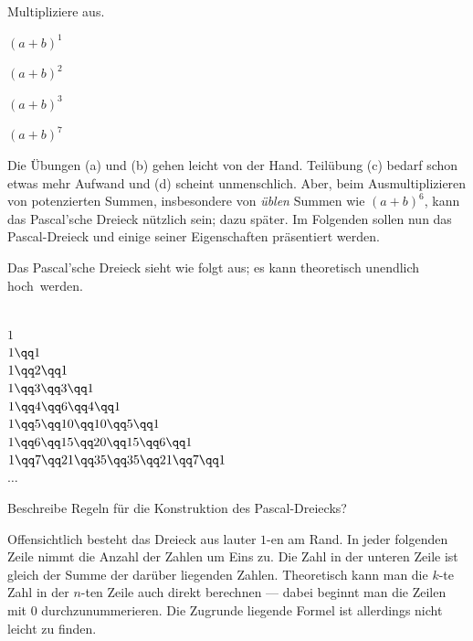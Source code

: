 \documentclass[%
11pt,%
twoside,%
titlepage,%
german,%
]{scrartcl}
\newcounter{theo}[section]\setcounter{theo}{0}
\begin{document}
\begin{ueb}[Binompotenzen]
Multipliziere aus.
  \\[2.5ex]\hspace*{2.7ex}
  \begin{minipage}{0.4\textwidth}
    \begin{enumeratea}
      \item $(a+b)^1$
      \item $(a+b)^2$\\[1ex]
    \end{enumeratea}
  \end{minipage}
  \begin{minipage}{0.23\textwidth}
    \begin{enumeratea}\addtocounter{enumi}{2}
      \item $(a+b)^3$
      \item $(a+b)^7$\\[1ex]
    \end{enumeratea}
  \end{minipage}
  \end{ueb}
  
Die Übungen (a) und (b) gehen leicht von der Hand. Teil\"ubung (c) bedarf schon etwas mehr Aufwand und (d) scheint unmenschlich. Aber, beim Ausmultiplizieren von potenzierten Summen, insbesondere von \emph{\"ublen} Summen wie $(a+b)^6$, kann das Pascal'sche Dreieck n\"utzlich sein; dazu sp\"ater. Im Folgenden sollen nun das Pascal-Dreieck und einige seiner Eigenschaften pr\"asentiert werden.

Das Pascal'sche Dreieck sieht wie folgt aus; es kann theoretisch unendlich \glqq hoch\grqq\ werden.

  \begin{center}
    \ \\[2pt]
    $1$\\[6pt]
    $1\qq1$\\[6pt]
    $1\qq2\qq1$\\[6pt]
    $1\qq3\qq3\qq1$\\[6pt]
    $1\qq4\qq6\qq4\qq1$\\[6pt]
    $1\qq5\qq10\qq10\qq5\qq1$\\[6pt]
    $1\qq6\qq15\qq20\qq15\qq6\qq1$\\[6pt]
    $1\qq7\qq21\qq35\qq35\qq21\qq7\qq1$\\[6pt]
    $\dots$
  \end{center}

\begin{frage}
Beschreibe Regeln f\"ur die Konstruktion des Pascal-Dreiecks?
\end{frage}
Offensichtlich besteht das Dreieck aus lauter $1$-en am Rand. In jeder folgenden Zeile nimmt die Anzahl der Zahlen um Eins zu. Die Zahl in der unteren Zeile ist gleich der Summe der dar\"uber liegenden Zahlen. Theoretisch kann man die $k$-te Zahl in der $n$-ten Zeile auch direkt berechnen  --- dabei beginnt man die Zeilen mit $0$ durchzunummerieren. Die Zugrunde liegende Formel ist allerdings nicht leicht zu finden.
\end{document}
